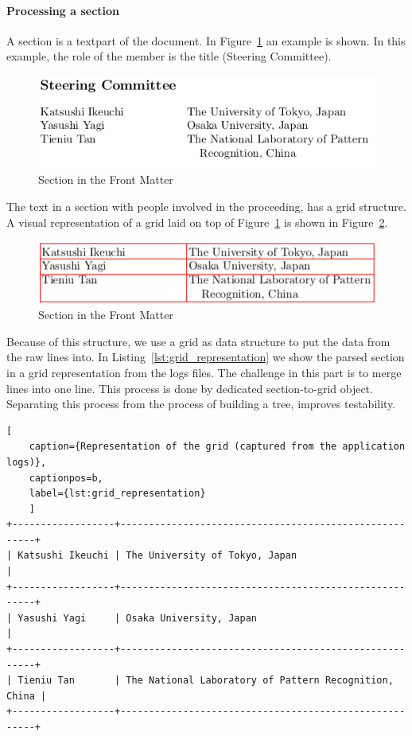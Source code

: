 \documentclass{ou-report}
\begin{document}
\paragraph{Processing a section}
A section is a textpart of the document. In 
Figure~\ref{fig:front_matter_section} an example is shown. In this example, the
role of the member is the title (Steering Committee).
\begin{figure}[ht]
    \centering
    \includegraphics[width=12cm]{images/front_matter/section.png}
    \caption{Section in the Front Matter}
    \label{fig:front_matter_section}
\end{figure}
The text in a section with people involved in the proceeding, has a grid
structure. A visual representation of a grid laid on top of 
Figure~\ref{fig:front_matter_section} is shown in 
Figure~\ref{fig:front_matter_section_grid}. 
\begin{figure}[H]
    \centering
    \includegraphics[width=12cm]{images/front_matter/section_table.png}
    \caption{Section in the Front Matter}
    \label{fig:front_matter_section_grid}
\end{figure}
Because of this structure, we use a grid as data structure to put the data from 
the raw lines into. In Listing~\ref{lst:grid_representation} we show the 
parsed section in a grid representation from the logs files. The challenge in
this part is to merge lines into one line. This process is done by dedicated
section-to-grid object. Separating this process from the process of building a
tree, improves testability.

\begin{lstlisting}[
    caption={Representation of the grid (captured from the application logs)},
    captionpos=b,
    label={lst:grid_representation}
    ]
+------------------+-------------------------------------------------------+
| Katsushi Ikeuchi | The University of Tokyo, Japan                        |
+------------------+-------------------------------------------------------+
| Yasushi Yagi     | Osaka University, Japan                               |
+------------------+-------------------------------------------------------+
| Tieniu Tan       | The National Laboratory of Pattern Recognition, China |
+------------------+-------------------------------------------------------+
\end{lstlisting}
\end{document}
